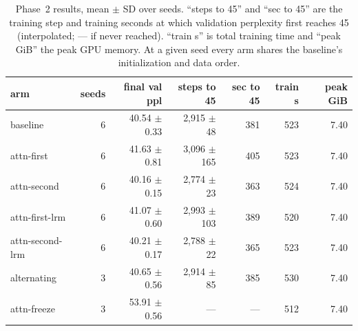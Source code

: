 \begin{table}[t]
\centering\small
\begin{tabular}{lrrrrrr}
\toprule
\textbf{arm} & \textbf{seeds} & \textbf{final val ppl} & \textbf{steps to 45} & \textbf{sec to 45} & \textbf{train s} & \textbf{peak GiB} \\
\midrule
baseline & 6 & 40.54 {\scriptsize$\pm$ 0.33} & 2,915 {\scriptsize$\pm$ 48} & 381 & 523 & 7.40 \\
attn-first & 6 & 41.63 {\scriptsize$\pm$ 0.81} & 3,096 {\scriptsize$\pm$ 165} & 405 & 523 & 7.40 \\
attn-second & 6 & 40.16 {\scriptsize$\pm$ 0.15} & 2,774 {\scriptsize$\pm$ 23} & 363 & 524 & 7.40 \\
attn-first-lrm & 6 & 41.07 {\scriptsize$\pm$ 0.60} & 2,993 {\scriptsize$\pm$ 103} & 389 & 520 & 7.40 \\
attn-second-lrm & 6 & 40.21 {\scriptsize$\pm$ 0.17} & 2,788 {\scriptsize$\pm$ 22} & 365 & 523 & 7.40 \\
alternating & 3 & 40.65 {\scriptsize$\pm$ 0.56} & 2,914 {\scriptsize$\pm$ 85} & 385 & 530 & 7.40 \\
attn-freeze & 3 & 53.91 {\scriptsize$\pm$ 0.56} & --- & --- & 512 & 7.40 \\
\bottomrule
\end{tabular}
\caption{Phase~2 results, mean $\pm$ SD over seeds. ``steps to 45'' and ``sec to 45'' are the training step and training seconds at which validation perplexity first reaches 45 (interpolated; --- if never reached). ``train s'' is total training time and ``peak GiB'' the peak GPU memory. At a given seed every arm shares the baseline's initialization and data order.}
\label{tab:p2}
\end{table}
